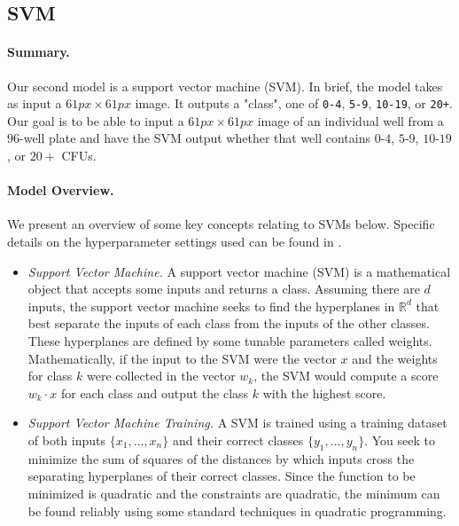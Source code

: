 \documentclass[10pt,letterpaper]{article}
\begin{document}
 

  \subsection*{SVM} \label{ssec:svm}
        \paragraph*{Summary.}
            Our second model is a support vector machine (SVM). In brief, the model takes as input a $61px \times 61px$ image. It outputs a "class", one of \texttt{0-4}, \texttt{5-9}, \texttt{10-19}, or \texttt{20+}. Our goal is to be able to input a $61px \times 61px$ image of an individual well from a $96$-well plate and have the SVM output whether that well contains $0$-$4$, $5$-$9$, $10$-$19$, or $20+$ CFUs.
        
        \paragraph*{Model Overview.}
            We present an overview of some key concepts relating to SVMs below. Specific details on the hyperparameter settings used can be found in .
            
            \begin{itemize}
                \item \textit{Support Vector Machine.}
                    A support vector machine (SVM) is a mathematical object that accepts some inputs and returns a class. Assuming there are $d$ inputs, the support vector machine seeks to find the hyperplanes in $\mathbb{R}^d$ that best separate the inputs of each class from the inputs of the other classes. These hyperplanes are defined by some tunable parameters called weights. Mathematically, if the input to the SVM were the vector $x$ and the weights for class $k$ were collected in the vector $w_k$, the SVM would compute a score $w_k \cdot x$ for each class and output the class $k$ with the highest score.
                \item \textit{Support Vector Machine Training.}
                    A SVM is trained using a training dataset of both inputs $\{x_1, \ldots, x_n\}$ and their correct classes $\{y_1, \ldots, y_n\}$. You seek to minimize the sum of squares of the distances by which inputs cross the separating hyperplanes of their correct classes. Since the function to be minimized is quadratic and the constraints are quadratic, the minimum can be found reliably using some standard techniques in quadratic programming.
            \end{itemize}
            
\end{document}
